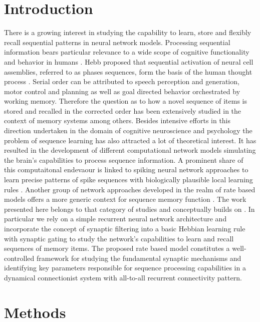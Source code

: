\documentclass{esannV2}
\begin{document}
\section{Introduction}
There is a growing interest in studying the capability to learn, store and flexibly recall sequential patterns in neural network models. Processing sequential information bears particular relevance to a wide scope of cognitive functionality and behavior in humans \cite{lashley1951problem}. Hebb proposed that sequential activation of neural cell assemblies, referred to as phases sequences, form the basis of the human thought process \cite{hebb2005organization}. Serial order can be attributed to speech perception and generation, motor control and planning as well as goal directed behavior orchestrated by working memory. Therefore the question as to how a novel sequence of items is stored and recalled in the corrected order has been extensively studied in the context of memory systems among others. Besides intensive efforts in this direction undertaken in the domain of cognitive neuroscience and psychology \cite{hurlstone2014memory} the problem of sequence learning has also attracted a lot of theoretical interest. It has resulted in the development of different computational network models simulating the brain's capabilities to process sequence information. A prominent share of this computaitonal endevaour is linked to spiking neural network approaches to learn precise patterns of spike sequences with biologically plausible local learning rules \cite{ans1994neural}\cite{dehaene1987neural}\cite{gutig2006tempotron}\cite{ponulak2010supervised}. Another group of network approaches developed in the realm of rate based models offers a more generic context for sequence memory function \cite{amari1972learning}\cite{kohonen1977principle}\cite{sandberg2002bayesian}. The work presented here belongs to that category of studies and conceptually builds on \cite{sandberg2002bayesian}. In particular we rely on a simple recurrent neural network architecture and incorporate the concept of synaptic filtering into a basic Hebbian learning rule with synaptic gating \cite{andrew2003spiking} to study the network's capabilities to learn and recall sequences of memory items. The proposed rate based model constitutes a well-controlled framework for studying the fundamental synaptic mechanisms and identifying key parameters responsible for sequence processing capabilities in a dynamical connectionist system with all-to-all recurrent connectivity pattern. 


\section{Methods}
\end{document}
